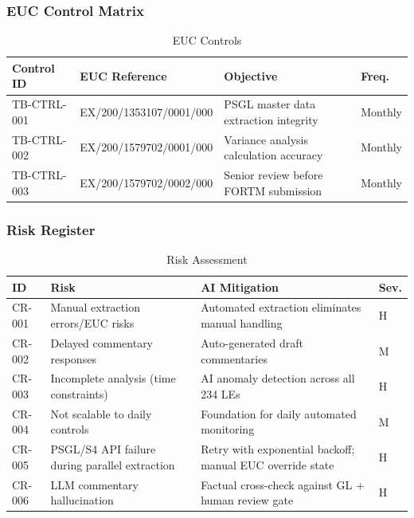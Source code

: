 \documentclass[11pt,a4paper]{article}
\begin{document}
\subsubsection{EUC Control Matrix}

\begin{table}[h]
\centering
\caption{EUC Controls}
\begin{tabular}{@{}L{2.5cm}L{4.5cm}L{5.5cm}C{1.5cm}@{}}
\toprule
\textbf{Control ID} & \textbf{EUC Reference} & \textbf{Objective} & \textbf{Freq.} \\
\midrule
TB-CTRL-001 & EX/200/1353107/0001/000 & PSGL master data extraction integrity & Monthly \\
TB-CTRL-002 & EX/200/1579702/0001/000 & Variance analysis calculation accuracy & Monthly \\
TB-CTRL-003 & EX/200/1579702/0002/000 & Senior review before FORTM submission & Monthly \\
\bottomrule
\end{tabular}
\end{table}

\subsubsection{Risk Register}

\begin{table}[h]
\centering
\caption{Risk Assessment}
\begin{tabular}{@{}C{1.5cm}L{4cm}L{7cm}C{1cm}@{}}
\toprule
\textbf{ID} & \textbf{Risk} & \textbf{AI Mitigation} & \textbf{Sev.} \\
\midrule
CR-001 & Manual extraction errors/EUC risks & Automated extraction eliminates manual handling & H \\
CR-002 & Delayed commentary responses & Auto-generated draft commentaries & M \\
CR-003 & Incomplete analysis (time constraints) & AI anomaly detection across all 234 LEs & H \\
CR-004 & Not scalable to daily controls & Foundation for daily automated monitoring & M \\
CR-005 & PSGL/S4 API failure during parallel extraction & Retry with exponential backoff; manual EUC override state & H \\
CR-006 & LLM commentary hallucination & Factual cross-check against GL + human review gate & H \\
\bottomrule
\end{tabular}
\end{table}
\end{document}
